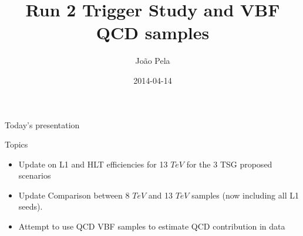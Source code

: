 \documentclass[8pt]{beamer}
\author[J. Pela]{João Pela}
\title{Run 2 Trigger Study and VBF QCD samples}
\institute[ICL]{Imperial College London}
\date{2014-04-14}
\begin{document}
\setlength{\unitlength}{1mm}

\begin{frame}
  \titlepage
\end{frame}

\begin{frame}{Today's presentation}
 
\begin{block}{Topics}
 
\begin{itemize}
  \item Update on L1 and HLT efficiencies for 13 $TeV$ for the 3 TSG proposed scenarios
  \item Update Comparison between 8 $TeV$ and 13 $TeV$ samples (now including all L1 seeds).
  \item Attempt to use QCD VBF samples to estimate QCD contribution in data
\end{itemize}
 
 
\end{block}

\end{frame}
\end{document}
